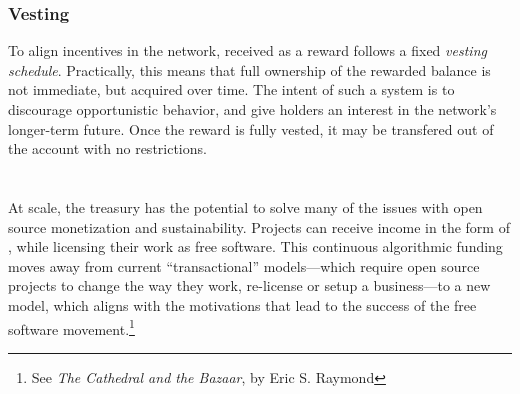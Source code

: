 \subsubsection{Vesting} To align incentives in the network, \oscoin{} received
as a reward follows a fixed \emph{vesting schedule}. Practically, this means
that full ownership of the rewarded balance is not immediate, but acquired over time. The
intent of such a system is to discourage opportunistic behavior, and give \oscoin{}
holders an interest in the network's longer-term future. Once the reward is
fully vested, it may be transfered out of the account with no restrictions.

\section*{}

\noindent At scale, the \oscoin{} treasury has the potential to solve many of
the issues with open source monetization and sustainability. Projects can
receive income in the form of \oscoin{}, while licensing their work as free
software. This continuous algorithmic funding moves
away from current ``transactional'' models---which require open source projects
to change the way they work, re-license or setup a business---to a new model,
which aligns with the motivations that lead to the success of the free software
movement.\footnote{See \emph{The Cathedral and the Bazaar}, by Eric S. Raymond}

